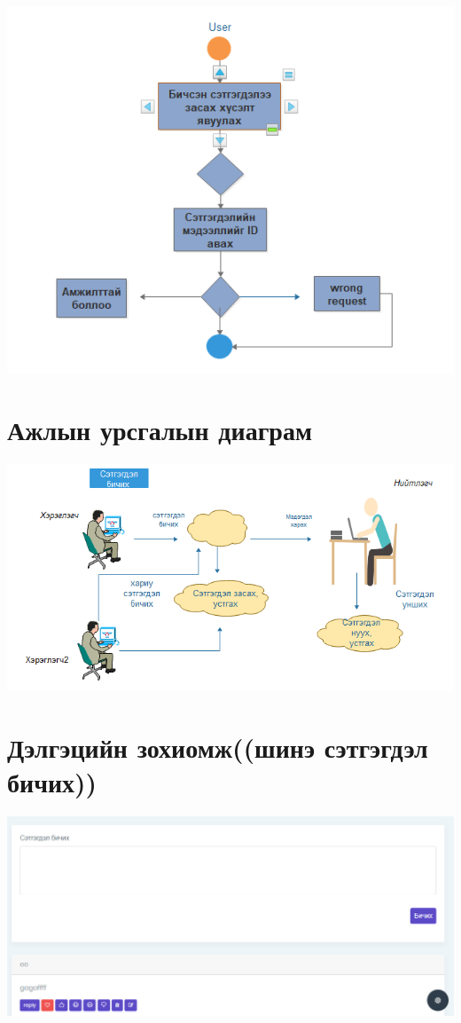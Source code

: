 \documentclass[12pt]{article}
\begin{document}
\includegraphics[scale=0.5]{Activity3} 

\section{Ажлын урсгалын диаграм}
\includegraphics[scale=0.5]{workflow2}
\section{Дэлгэцийн зохиомж((шинэ сэтгэгдэл бичих))}
\includegraphics[scale=0.5]{soyoloo1}
\end{document}
